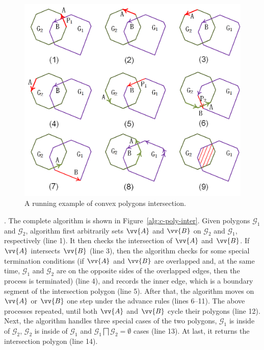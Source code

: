 \begin{figure}[tb!]
\centering
\includegraphics[scale=0.88]{figures/Fig-convex-poly-inter.png}
\vspace{-2ex}
\caption{\small A running example of convex polygons intersection.}
\vspace{-2ex}
\label{fig:c-poly-inter}
\end{figure}


. The complete algorithm is shown in Figure~\ref{alg:c-poly-inter}.
Given polygons $\mathcal{G}_1$ and $\mathcal{G}_2$, algorithm \cpia first arbitrarily sets $\vv{A}$ and $\vv{B}$ on $\mathcal{G}_2$ and $\mathcal{G}_1$, respectively (line 1).
%
It then checks the intersection of $\vv{A}$ and $\vv{B}$. If $\vv{A}$ intersects $\vv{B}$ (line 3), then the algorithm checks for some special termination conditions (\eg if $\vv{A}$ and $\vv{B}$ are overlapped and, at the same time, $\mathcal{G}_1$ and $\mathcal{G}_2$ are on the opposite sides of the overlapped edges, then the process is terminated) (line 4), and records the inner edge, which is a boundary segment of the intersection polygon (line 5).
After that, the algorithm moves on $\vv{A}$ or $\vv{B}$ one step under the advance rules (lines 6--11).
The above processes repeated, until both $\vv{A}$ and $\vv{B}$ cycle their polygons (line 12).
%
Next, the algorithm handles three special cases of the two polygons, \ie $\mathcal{G}_1$ is inside of $\mathcal{G}_2$, $\mathcal{G}_2$ is inside of $\mathcal{G}_1$ and $\mathcal{G}_1 \bigsqcap \mathcal{G}_2 = \emptyset$ cases (line 13).
%
At last, it returns the intersection polygon (line 14).


